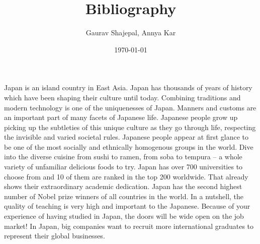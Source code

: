 \documentclass{article}
\title{Bibliography}
\author{Gaurav Shajepal, Annya Kar}
\date{\today}
\begin{document}
\maketitle
 
 
Japan is an island country in East Asia. Japan has thousands of years of history which have been shaping their culture until today. Combining traditions and modern technology is one of the uniquenesses of Japan. Manners and customs are an important part of many facets of Japanese life. Japanese people grow up picking up the subtleties of this unique culture as they go through life, respecting the invisible and varied societal rules. Japanese people appear at first glance to be one of the most socially and ethnically homogenous groups in the world. Dive into the diverse cuisine from sushi to ramen, from soba to tempura – a whole variety of unfamiliar delicious foods to try. 
Japan has over 700 universities to choose from and 10 of them are ranked in the top 200 worldwide. That already shows their extraordinary academic dedication. Japan has the second highest number of Nobel prize winners of all countries in the world. In a nutshell, the quality of teaching is very high and important to the Japanese.
Because of your experience of having studied in Japan, the doors will be wide open on the job market! In Japan, big companies want to recruit more international graduates to represent their global businesses.
 
\medskip
\end{document}
